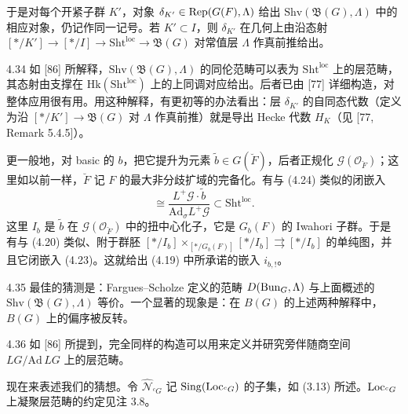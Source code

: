 于是对每个开紧子群 $K'$，对象 $\delta_{K'}\in\operatorname{Rep}(G(F),\Lambda)$ 给出 $\mathrm{Shv}(\mathfrak B(G),\Lambda)$ 中的相应对象，仍记作同一记号。若 $K'\subset I$，则 $\delta_{K'}$ 在几何上由沿态射 $[*/K']\to[*/I]\to\mathrm{Sht}^{\mathrm{loc}}\to\mathfrak B(G)$ 对常值层 $\Lambda$ 作真前推给出。

\begin{rem}{4.34}\label{thm:a2-4-34}
如 [86] 所解释，$\mathrm{Shv}(\mathfrak B(G),\Lambda)$ 的同伦范畴可以表为 $\mathrm{Sht}^{\mathrm{loc}}$ 上的层范畴，其态射由支撑在 $\mathrm{Hk}(\mathrm{Sht}^{\mathrm{loc}})$ 上的上同调对应给出。后者已由 [77] 详细构造，对整体应用很有用。用这种解释，有更初等的办法看出：层 $\delta_{K'}$ 的自同态代数（定义为沿 $[*/K']\to\mathfrak B(G)$ 对 $\Lambda$ 作真前推）就是导出 Hecke 代数 $H_K$（见 [77, Remark 5.4.5]）。
\end{rem}

更一般地，对 basic 的 $b$，把它提升为元素 $\tilde b\in G(\breve F)$，后者正规化 $\mathcal G(\mathcal O_{\breve F})$；这里如以前一样，$\breve F$ 记 $F$ 的最大非分歧扩域的完备化。有与 (4.24) 类似的闭嵌入
\begin{equation}
[*/I_b]\cong\frac{L^+\mathcal G\cdot\tilde b}{\mathrm{Ad}_\sigma L^+\mathcal G}\subset\mathrm{Sht}^{\mathrm{loc}}. \tag{4.25}\label{eq:a2-4-25}
\end{equation}
这里 $I_b$ 是 $\tilde b$ 在 $\mathcal G(\mathcal O_{\breve F})$ 中的扭中心化子，它是 $G_b(F)$ 的 Iwahori 子群。于是有与 (4.20) 类似、附于群胚 $[*/I_b]\times_{[*/G_b(F)]}[*/I_b]\rightrightarrows[*/I_b]$ 的单纯图，并且它闭嵌入 (4.23)。这就给出 (4.19) 中所承诺的嵌入 $i_{b,!}$。

\begin{rem}{4.35}\label{thm:a2-4-35}
最佳的猜测是：Fargues–Scholze 定义的范畴 $D(\operatorname{Bun}_G,\Lambda)$ 与上面概述的 $\mathrm{Shv}(\mathfrak B(G),\Lambda)$ 等价。一个显著的现象是：在 $B(G)$ 的上述两种解释中，$B(G)$ 上的偏序被反转。
\end{rem}

\begin{rem}{4.36}\label{thm:a2-4-36}
如 [86] 所提到，完全同样的构造可以用来定义并研究旁伴随商空间 $LG/\mathrm{Ad}\,LG$ 上的层范畴。
\end{rem}

现在来表述我们的猜想。令 $\hat{\mathcal N}_{{}^{c}G}$ 记 $\operatorname{Sing}(\operatorname{Loc}_{{}^{c}G})$ 的子集，如 (3.13) 所述。$\operatorname{Loc}_{{}^{c}G}$ 上凝聚层范畴的约定见注 3.8。

